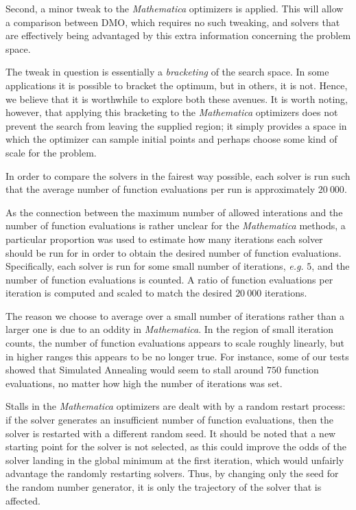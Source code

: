 \documentclass[12pt]{article}
\begin{document}
Second, a minor tweak to the \emph{Mathematica} optimizers is applied. This
will allow a comparison between DMO, which requires no such tweaking,
and solvers that are effectively being advantaged by this extra information
concerning the problem space.

The tweak in question is essentially a \emph{bracketing} of the search
space. In some applications it is possible to bracket the optimum, but in
others, it is not. Hence, we believe that it is worthwhile to explore both
these avenues. It is worth noting, however, that applying this bracketing to
the \emph{Mathematica} optimizers does not prevent the search from leaving the
supplied region; it simply provides a space in which the optimizer can sample
initial points and perhaps choose some kind of scale for the problem.

In order to compare the solvers in the fairest way possible, each solver is
run such that the average number of function evaluations per run is
approximately $20~000$.

As the connection between the maximum number of allowed interations and the
number of function evaluations is rather unclear for the \emph{Mathematica}
methods, a particular proportion was used to estimate how many iterations
each solver should be run for in order to obtain the desired number of
function evaluations.
Specifically, each solver is run for some small number of iterations,
\emph{e.g.} $5$, and the number of function evaluations is counted.
A ratio of function evaluations per iteration is computed and scaled to
match the desired $20~000$ iterations.

The reason we choose to average over a small number of iterations rather
than a larger one is due to an oddity in \emph{Mathematica}.
In the region of small iteration counts, the number of function evaluations
appears to scale roughly linearly, but in higher ranges this appears to be
no longer true.
For instance, some of our tests showed that Simulated Annealing would seem
to stall around $750$ function evaluations, no matter how high the number
of iterations was set.

Stalls in the \emph{Mathematica} optimizers are dealt with by a random
restart process: if the solver generates an insufficient number of function
evaluations, then the solver is restarted with a different random seed.
It should be noted that a new starting point for the solver is not selected, as
this could improve the odds of the solver landing in the global minimum at the
first iteration, which would unfairly advantage the randomly restarting
solvers. Thus, by changing only the seed for the random number generator,
it is only the trajectory of the solver that is affected.
\end{document}
